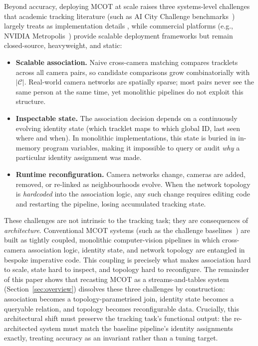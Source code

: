 \documentclass[review]{elsarticle}
\begin{document}
Beyond accuracy, deploying MCOT at scale raises three systems-level challenges that academic tracking literature (such as AI City Challenge benchmarks~\cite{wang2024aicity}) largely treats as implementation details %
, while commercial platforms (e.g., NVIDIA Metropolis~\cite{nvidia2025metropolis}) provide scalable deployment frameworks but remain closed-source, heavyweight, and static:

\begin{itemize}[leftmargin=*]
    \item \textbf{Scalable association.} Naive cross-camera matching compares tracklets across all camera pairs, so candidate comparisons grow combinatorially with $|\mathcal{C}|$. Real-world camera networks are spatially sparse; most pairs never see the same person at the same time, yet monolithic pipelines do not exploit this structure.
    \item \textbf{Inspectable state.} The association decision depends on a continuously evolving identity state (which tracklet maps to which global ID, last seen where and when). In monolithic implementations, this state is buried in in-memory program variables, making it impossible to query or audit \emph{why} a particular identity assignment was made.
    \item \textbf{Runtime reconfiguration.} Camera networks change, cameras are added, removed, or re-linked as neighbourhoods evolve. When the network topology is \emph{hardcoded} into the association logic, any such change requires editing code and restarting the pipeline, losing accumulated tracking state.
\end{itemize}

These challenges are not intrinsic to the tracking task; they are consequences of \emph{architecture}. Conventional MCOT systems (such as the challenge baselines~\cite{yoshida2024overlap,specker2024ocmctrack,yang2024online}) %
are built as tightly coupled, monolithic computer-vision pipelines in which cross-camera association logic, identity state, and network topology are entangled in bespoke imperative code. This coupling is precisely what makes association hard to scale, state hard to inspect, and topology hard to reconfigure. The remainder of this paper shows that recasting MCOT as a streams-and-tables system (Section~\ref{sec:overview}) dissolves these three challenges by construction: association becomes a topology-parametrised join, identity state becomes a queryable relation, and topology becomes reconfigurable data. Crucially, this architectural shift must preserve the tracking task's functional output: the re-architected system must match the baseline pipeline's identity assignments exactly, treating accuracy as an invariant rather than a tuning target.
\end{document}
